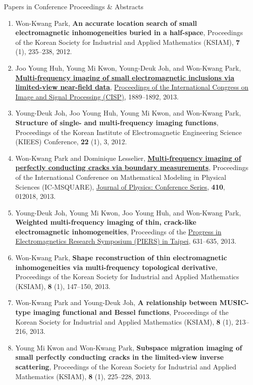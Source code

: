 \documentclass{resume} %
\begin{document}
\begin{rSection}{Papers in Conference Proceedings \& Abstracts}
\begin{enumerate}
\item\label{C-KSIAM2012} Won-Kwang Park, \textbf{An accurate location search of small electromagnetic inhomogeneities buried in a half-space}, Proceedings of the Korean Society for Industrial and Applied Mathematics (KSIAM), \textbf{7} (1), 235--238, 2012.
\item\label{C-CISP2013A} Joo Young Huh, Young Mi Kwon, Young-Deuk Joh, and Won-Kwang Park, \href{http://dx.doi.org/10.1109/CISP.2012.6469648}{\textbf{Multi-frequency imaging of small electromagnetic inclusions via limited-view near-field data}}, \href{http://ieeexplore.ieee.org/xpl/mostRecentIssue.jsp?punumber=6459618}{Proceedings of the  International Congress on Image and Signal Processing (CISP)}, 1889--1892, 2013.
\item\label{C-KIEES2012} Young-Deuk Joh, Joo Young Huh, Young Mi Kwon, and Won-Kwang Park, \textbf{Structure of single- and multi-frequency imaging functions}, Proceedings of the Korean Institute of Electromagnetic Engineering Science (KIEES) Conference, \textbf{22} (1), 3, 2012.
\item\label{C-ICMSQUARE2013} Won-Kwang Park and Dominique Lesselier, \href{http://dx.doi.org/10.1088/1742-6596/410/1/012018}{\textbf{Multi-frequency imaging of perfectly conducting cracks via boundary measurements}}, Proceedings of the International Conference on Mathematical Modeling in Physical Sciences (IC-MSQUARE), \href{http://iopscience.iop.org/1742-6596/}{Journal of Physics: Conference Series}, \textbf{410}, 012018, 2013.
\item\label{C-PIERS2013} Young-Deuk Joh, Young Mi Kwon, Joo Young Huh, and Won-Kwang Park, \textbf{Weighted multi-frequency imaging of thin, crack-like electromagnetic inhomogeneities}, Proceedings of the \href{http://www.piers.org/piers2013Taipei/}{Progress in Electromagnetics Research Symposium (PIERS) in Taipei}, 631--635, 2013.
\item\label{C-KSIAM2013A} Won-Kwang Park, \textbf{Shape reconstruction of thin electromagnetic inhomogeneities via multi-frequency topological derivative}, Proceedings of the Korean Society for Industrial and Applied Mathematics (KSIAM), \textbf{8} (1), 147--150, 2013.
\item\label{C-KSIAM2013B} Won-Kwang Park and Young-Deuk Joh, \textbf{A relationship between MUSIC-type imaging functional and Bessel functions}, Proceedings of the Korean Society for Industrial and Applied Mathematics (KSIAM), \textbf{8} (1), 213--216, 2013.
\item\label{C-KSIAM2013C} Young Mi Kwon and Won-Kwang Park, \textbf{Subspace migration imaging of small perfectly conducting cracks in the limited-view inverse scattering}, Proceedings of the Korean Society for Industrial and Applied Mathematics (KSIAM), \textbf{8} (1), 225--228, 2013.

\end{enumerate}
\end{rSection}
\end{document}
